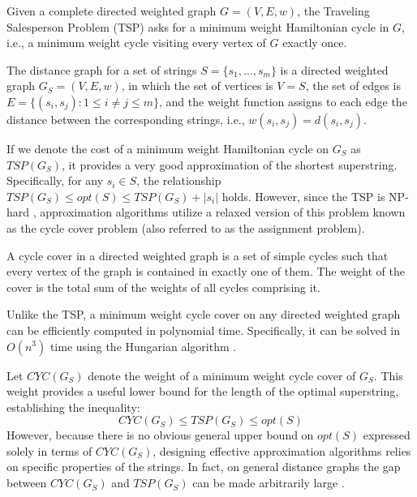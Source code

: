 \begin{definition}
Given a complete directed weighted graph $G = (V, E, w)$, the Traveling
Salesperson Problem (TSP) asks for a minimum weight Hamiltonian cycle in $G$,
i.e., a minimum weight cycle visiting every vertex of $G$ exactly once.
\end{definition}

\begin{definition}
The distance graph for a set of strings $S = \{s_1, \dots, s_m\}$ is a directed
weighted graph $G_S = (V,E,w)$, in which the set of vertices is $V = S$, the set
of edges is $E = \{(s_i, s_j) \colon 1 \le i \neq j \le m\}$, and the weight
function assigns to each edge the distance between the corresponding strings,
i.e., $w(s_i, s_j) = d(s_i, s_j)$.
\end{definition}

If we denote the cost of a minimum weight Hamiltonian cycle on $G_S$ as
$TSP(G_S)$, it provides a very good approximation of the shortest superstring.
Specifically, for any $s_i \in S$, the relationship $TSP(G_S) \le opt(S) \le
TSP(G_S) + |s_i|$ holds. However, since the TSP is NP-hard
\cite{karp1972reducibility}, approximation algorithms utilize a relaxed version
of this problem known as the cycle cover problem (also referred to as the
assignment problem).

\begin{definition}
A cycle cover in a directed weighted graph is a set of simple cycles such that
every vertex of the graph is contained in exactly one of them. The weight of the
cover is the total sum of the weights of all cycles comprising it.
\end{definition}

Unlike the TSP, a minimum weight cycle cover on any directed weighted graph can
be efficiently computed in polynomial time. Specifically, it can be solved in
$O(n^3)$ time using the Hungarian algorithm \cite{kuhn1955hungarian, edmondskarp1972, tomizawa1971techniques}.

Let $CYC(G_S)$ denote the weight of a minimum weight cycle cover of $G_S$. This
weight provides a useful lower bound for the length of the optimal superstring,
establishing the inequality:
\begin{equation}\label{eq:1.3}
CYC(G_S) \le TSP(G_S) \le opt(S)
\end{equation}
However, because there is no obvious general upper bound on $opt(S)$ expressed
solely in terms of $CYC(G_S)$, designing effective approximation algorithms
relies on specific properties of the strings. In fact, on general distance
graphs the gap between $CYC(G_S)$ and $TSP(G_S)$ can be made arbitrarily large
\cite{sahni1976pcomplete}.
